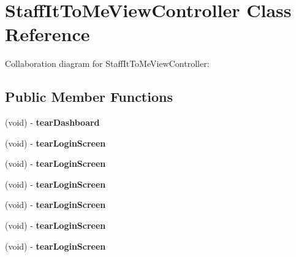 \hypertarget{interface_staff_it_to_me_view_controller}{
\section{\-Staff\-It\-To\-Me\-View\-Controller \-Class \-Reference}
\label{interface_staff_it_to_me_view_controller}
}


\-Collaboration diagram for \-Staff\-It\-To\-Me\-View\-Controller\-:
\subsection*{\-Public \-Member \-Functions}
\begin{DoxyCompactItemize}
\item 
\hypertarget{interface_staff_it_to_me_view_controller_a77281aabaea1f587ae00a984793b3a6b}{
(void) -\/ {\bfseries tear\-Dashboard}}
\label{interface_staff_it_to_me_view_controller_a77281aabaea1f587ae00a984793b3a6b}

\item 
\hypertarget{interface_staff_it_to_me_view_controller_a3de6838d0207ab6f2742245f281bed87}{
(void) -\/ {\bfseries tear\-Login\-Screen}}
\label{interface_staff_it_to_me_view_controller_a3de6838d0207ab6f2742245f281bed87}

\item 
\hypertarget{interface_staff_it_to_me_view_controller_a3de6838d0207ab6f2742245f281bed87}{
(void) -\/ {\bfseries tear\-Login\-Screen}}
\label{interface_staff_it_to_me_view_controller_a3de6838d0207ab6f2742245f281bed87}

\item 
\hypertarget{interface_staff_it_to_me_view_controller_a3de6838d0207ab6f2742245f281bed87}{
(void) -\/ {\bfseries tear\-Login\-Screen}}
\label{interface_staff_it_to_me_view_controller_a3de6838d0207ab6f2742245f281bed87}

\item 
\hypertarget{interface_staff_it_to_me_view_controller_a3de6838d0207ab6f2742245f281bed87}{
(void) -\/ {\bfseries tear\-Login\-Screen}}
\label{interface_staff_it_to_me_view_controller_a3de6838d0207ab6f2742245f281bed87}

\item 
\hypertarget{interface_staff_it_to_me_view_controller_a3de6838d0207ab6f2742245f281bed87}{
(void) -\/ {\bfseries tear\-Login\-Screen}}
\label{interface_staff_it_to_me_view_controller_a3de6838d0207ab6f2742245f281bed87}

\item 
\hypertarget{interface_staff_it_to_me_view_controller_a3de6838d0207ab6f2742245f281bed87}{
(void) -\/ {\bfseries tear\-Login\-Screen}}
\label{interface_staff_it_to_me_view_controller_a3de6838d0207ab6f2742245f281bed87}

\end{DoxyCompactItemize}
